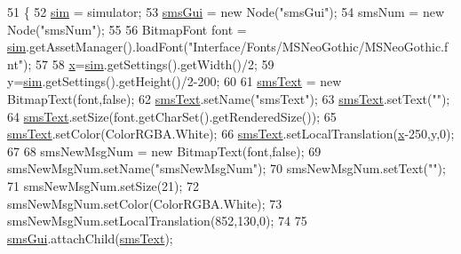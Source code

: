 \begin{DoxyCode}
51   \{
52     \hyperlink{classkr_1_1ac_1_1kookmin_1_1cs_1_1sms_1_1_sms_hud_af6e0bca70fb93df48b91fa40cf202ec0}{sim} = simulator;
53     \hyperlink{classkr_1_1ac_1_1kookmin_1_1cs_1_1sms_1_1_sms_hud_a45c98373f394ac95c2e360e2625a81ef}{smsGui} = \textcolor{keyword}{new} Node(\textcolor{stringliteral}{"smsGui"});
54     smsNum = \textcolor{keyword}{new} Node(\textcolor{stringliteral}{"smsNum"});
55 
56     BitmapFont font = \hyperlink{classkr_1_1ac_1_1kookmin_1_1cs_1_1sms_1_1_sms_hud_af6e0bca70fb93df48b91fa40cf202ec0}{sim}.getAssetManager().loadFont(\textcolor{stringliteral}{"Interface/Fonts/MSNeoGothic/MSNeoGothic.fnt"});
57 
58     \hyperlink{classkr_1_1ac_1_1kookmin_1_1cs_1_1sms_1_1_sms_hud_a6686da2137e471f3bf9cd38b5fa8eaa5}{x}=\hyperlink{classkr_1_1ac_1_1kookmin_1_1cs_1_1sms_1_1_sms_hud_af6e0bca70fb93df48b91fa40cf202ec0}{sim}.getSettings().getWidth()/2;
59     y=\hyperlink{classkr_1_1ac_1_1kookmin_1_1cs_1_1sms_1_1_sms_hud_af6e0bca70fb93df48b91fa40cf202ec0}{sim}.getSettings().getHeight()/2-200;
60 
61     \hyperlink{classkr_1_1ac_1_1kookmin_1_1cs_1_1sms_1_1_sms_hud_a6a1a2ed2311a25a2e28f6a527aec312f}{smsText} = \textcolor{keyword}{new} BitmapText(font,\textcolor{keyword}{false});
62     \hyperlink{classkr_1_1ac_1_1kookmin_1_1cs_1_1sms_1_1_sms_hud_a6a1a2ed2311a25a2e28f6a527aec312f}{smsText}.setName(\textcolor{stringliteral}{"smsText"});
63     \hyperlink{classkr_1_1ac_1_1kookmin_1_1cs_1_1sms_1_1_sms_hud_a6a1a2ed2311a25a2e28f6a527aec312f}{smsText}.setText(\textcolor{stringliteral}{""});
64     \hyperlink{classkr_1_1ac_1_1kookmin_1_1cs_1_1sms_1_1_sms_hud_a6a1a2ed2311a25a2e28f6a527aec312f}{smsText}.setSize(font.getCharSet().getRenderedSize());
65     \hyperlink{classkr_1_1ac_1_1kookmin_1_1cs_1_1sms_1_1_sms_hud_a6a1a2ed2311a25a2e28f6a527aec312f}{smsText}.setColor(ColorRGBA.White);
66     \hyperlink{classkr_1_1ac_1_1kookmin_1_1cs_1_1sms_1_1_sms_hud_a6a1a2ed2311a25a2e28f6a527aec312f}{smsText}.setLocalTranslation(\hyperlink{classkr_1_1ac_1_1kookmin_1_1cs_1_1sms_1_1_sms_hud_a6686da2137e471f3bf9cd38b5fa8eaa5}{x}-250,y,0);
67 
68     smsNewMsgNum = \textcolor{keyword}{new} BitmapText(font,\textcolor{keyword}{false});
69     smsNewMsgNum.setName(\textcolor{stringliteral}{"smsNewMsgNum"});
70     smsNewMsgNum.setText(\textcolor{stringliteral}{""});
71     smsNewMsgNum.setSize(21);
72     smsNewMsgNum.setColor(ColorRGBA.White);
73     smsNewMsgNum.setLocalTranslation(852,130,0);
74 
75     \hyperlink{classkr_1_1ac_1_1kookmin_1_1cs_1_1sms_1_1_sms_hud_a45c98373f394ac95c2e360e2625a81ef}{smsGui}.attachChild(\hyperlink{classkr_1_1ac_1_1kookmin_1_1cs_1_1sms_1_1_sms_hud_a6a1a2ed2311a25a2e28f6a527aec312f}{smsText});

\end{DoxyCode}
